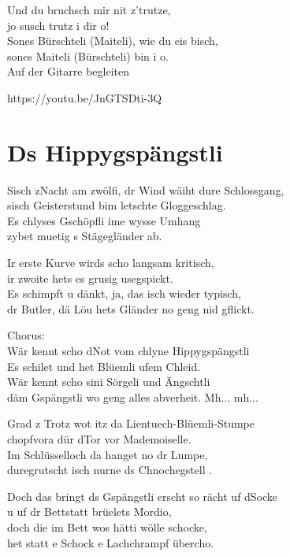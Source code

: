 \documentclass[
  letterpaper,
]{scrbook}
\begin{document}
Und du bruchsch mir nit z'trutze,\\
jo susch trutz i dir o!\\
Sones Bürschteli (Maiteli), wie du eis bisch,\\
sones Maiteli (Bürschteli) bin i o.\\
Auf der Gitarre begleiten

https://youtu.be/JnGTSDti-3Q

\hypertarget{ds-hippygspuxe4ngstli}{%
\chapter{Ds Hippygspängstli}\label{ds-hippygspuxe4ngstli}}

S\textquotesingle isch z\textquotesingle Nacht am zwölfi, dr Wind wäiht
dure Schlossgang,\\
s\textquotesingle isch Geisterstund bim letschte Gloggeschlag.\\
Es chlyses Gschöpfli ime wysse Umhang\\
zybet muetig s Stägegländer ab.

Ir erste Kurve wird\textquotesingle s scho langsam kritisch,\\
ir zwoite hets es grusig usegspickt.\\
Es schimpft u dänkt, ja, das isch wieder typisch,\\
dr Butler, dä Löu het\textquotesingle s Gländer no geng nid gflickt.

Chorus:\\
Wär kennt scho d\textquotesingle Not vom chlyne Hippygspängstli\\
Es schilet und het Blüemli ufem Chleid.\\
Wär kennt scho sini Sörgeli und Ängschtli\\
däm Gspängstli wo geng alles abverheit. Mh... mh...

Grad z Trotz wot itz da Lientuech-Blüemli-Stumpe\\
chopfvora dür d\textquotesingle Tor vor Mademoiselle.\\
Im Schlüsselloch da hanget no dr Lumpe,\\
duregrutscht isch nurne ds Chnochegstell .

Doch das bringt ds Gspängstli erscht so rächt uf
d\textquotesingle Socke\\
u uf dr Bettstatt brüelet\textquotesingle s Mordio,\\
doch die im Bett wo\textquotesingle s hätti wölle schocke,\\
het statt e Schock e Lachchrampf übercho.
\end{document}
